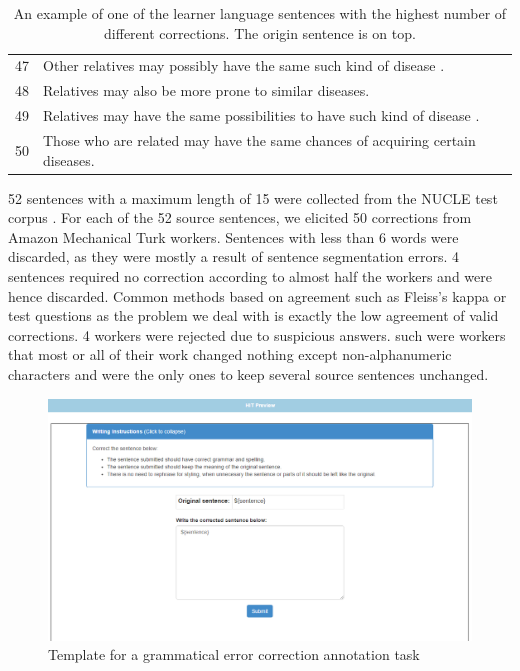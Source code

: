 \documentclass[letterpaper, 11pt]{article}
\begin{document}
\begin{table}[]
\begin{tabular}{ll}
		47                           & Other relatives may possibly have the same such kind of disease .                     \\
		48                           & Relatives may also be more prone to similar diseases.                                 \\
		49                           & Relatives may have the same possibilities to have such kind of disease .              \\
		50                           & Those who are related may have the same chances of acquiring certain diseases.       
	\end{tabular}
		\caption{An example of one of the learner language sentences with the highest number of different corrections. The origin sentence is on top.}
\end{table}
52 sentences with a maximum length of 15 were collected from the NUCLE test corpus \cite{dahlmeier2013building}. 
For each of the 52 source sentences, 
we elicited 50 corrections from Amazon Mechanical Turk workers.
Sentences with less than 6 words were discarded, as they were mostly a result of sentence segmentation errors.
4 sentences required no correction according to almost half the workers and were hence discarded.
Common methods based on agreement such as Fleiss's kappa or test questions as the problem we deal with is exactly the low agreement of valid corrections.
4 workers were rejected due to suspicious answers. such were workers that most or all of their work changed nothing except non-alphanumeric characters and were the only ones to keep several source sentences unchanged. 

\begin{figure}[h!]
	\includegraphics[width=0.9\columnwidth]{correction_task}
	\caption{Template for a grammatical error correction annotation task} 
\end{figure}
\FloatBarrier
\end{document}
